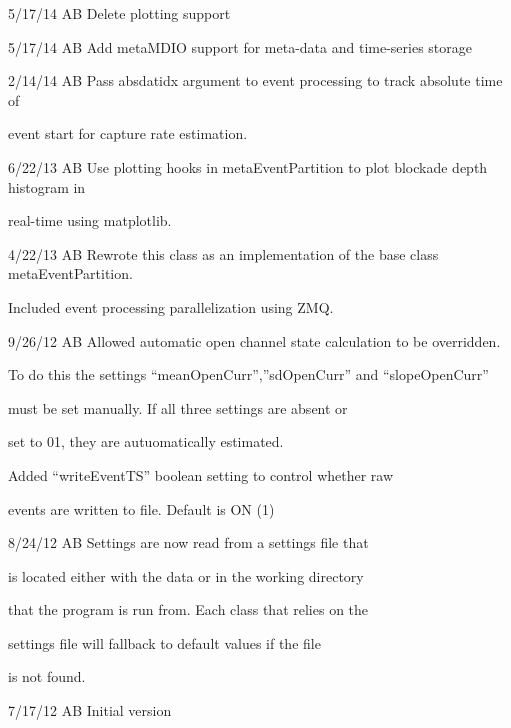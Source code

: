 \documentclass[letterpaper,10pt,english]{sphinxmanual}
\begin{document}
\begin{DUlineblock}{0em}
\item[] 5/17/14         AB  Delete plotting support
\item[] 5/17/14         AB  Add metaMDIO support for meta-data and time-series storage
\item[] 2/14/14         AB      Pass absdatidx argument to event processing to track absolute time of
\item[]
\begin{DUlineblock}{\DUlineblockindent}
\item[] event start for capture rate estimation.
\end{DUlineblock}
\item[] 6/22/13         AB      Use plotting hooks in metaEventPartition to plot blockade depth histogram in
\item[]
\begin{DUlineblock}{\DUlineblockindent}
\item[] real-time using matplotlib.
\end{DUlineblock}
\item[] 4/22/13         AB      Rewrote this class as an implementation of the base class metaEventPartition.
\item[]
\begin{DUlineblock}{\DUlineblockindent}
\item[] Included event processing parallelization using ZMQ.
\end{DUlineblock}
\item[] 9/26/12         AB  Allowed automatic open channel state calculation to be overridden.
\item[]
\begin{DUlineblock}{\DUlineblockindent}
\item[] To do this the settings ``meanOpenCurr'',''sdOpenCurr'' and ``slopeOpenCurr''
\item[] must be set manually. If all three settings are absent or
\item[] set to 01, they are autuomatically estimated.
\item[] Added ``writeEventTS'' boolean setting to control whether raw
\item[] events are written to file. Default is ON (1)
\end{DUlineblock}
\item[] 8/24/12         AB      Settings are now read from a settings file that
\item[]
\begin{DUlineblock}{\DUlineblockindent}
\item[] is located either with the data or in the working directory
\item[] that the program is run from. Each class that relies on the
\item[] settings file will fallback to default values if the file
\item[] is not found.
\end{DUlineblock}
\item[] 7/17/12         AB      Initial version
\end{DUlineblock}
\end{document}
